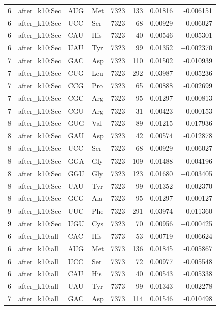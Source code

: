 \begin{longtable}{r l l l r r r r}
6 & after\_k10:Sec & AUG & Met & 7323 & 133 & 0.01816 & -0.006151 \\
6 & after\_k10:Sec & UCC & Ser & 7323 & 68 & 0.00929 & -0.006027 \\
6 & after\_k10:Sec & CAU & His & 7323 & 40 & 0.00546 & -0.005301 \\
6 & after\_k10:Sec & UAU & Tyr & 7323 & 99 & 0.01352 & +0.002370 \\
7 & after\_k10:Sec & GAC & Asp & 7323 & 110 & 0.01502 & -0.010939 \\
7 & after\_k10:Sec & CUG & Leu & 7323 & 292 & 0.03987 & -0.005236 \\
7 & after\_k10:Sec & CCG & Pro & 7323 & 65 & 0.00888 & -0.002699 \\
7 & after\_k10:Sec & CGC & Arg & 7323 & 95 & 0.01297 & +0.000813 \\
7 & after\_k10:Sec & CGU & Arg & 7323 & 31 & 0.00423 & -0.000153 \\
8 & after\_k10:Sec & GUG & Val & 7323 & 89 & 0.01215 & -0.017936 \\
8 & after\_k10:Sec & GAU & Asp & 7323 & 42 & 0.00574 & -0.012878 \\
8 & after\_k10:Sec & UCC & Ser & 7323 & 68 & 0.00929 & -0.006027 \\
8 & after\_k10:Sec & GGA & Gly & 7323 & 109 & 0.01488 & -0.004196 \\
8 & after\_k10:Sec & GGU & Gly & 7323 & 123 & 0.01680 & +0.003405 \\
8 & after\_k10:Sec & UAU & Tyr & 7323 & 99 & 0.01352 & +0.002370 \\
8 & after\_k10:Sec & GCG & Ala & 7323 & 95 & 0.01297 & -0.000127 \\
9 & after\_k10:Sec & UUC & Phe & 7323 & 291 & 0.03974 & +0.011360 \\
9 & after\_k10:Sec & UGU & Cys & 7323 & 70 & 0.00956 & +0.000425 \\
6 & after\_k10:all & CAC & His & 7373 & 53 & 0.00719 & -0.006624 \\
6 & after\_k10:all & AUG & Met & 7373 & 136 & 0.01845 & -0.005867 \\
6 & after\_k10:all & UCC & Ser & 7373 & 72 & 0.00977 & -0.005548 \\
6 & after\_k10:all & CAU & His & 7373 & 40 & 0.00543 & -0.005338 \\
6 & after\_k10:all & UAU & Tyr & 7373 & 99 & 0.01343 & +0.002278 \\
7 & after\_k10:all & GAC & Asp & 7373 & 114 & 0.01546 & -0.010498 \\

\end{longtable}
